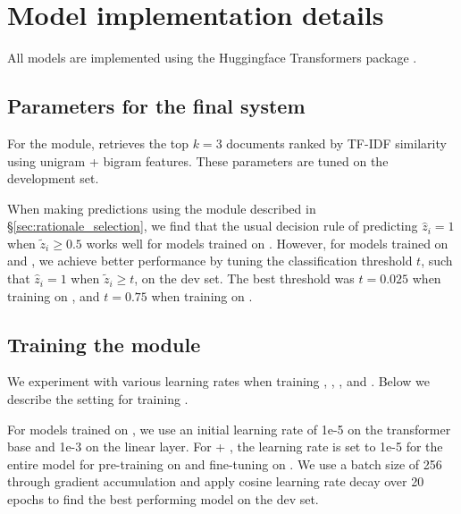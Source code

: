 \clearpage

\appendix

\section{Model implementation details} \label{sec:model_details}

All models are implemented using the Huggingface Transformers package \cite{Wolf2019HuggingFacesTS}.


\subsection{Parameters for the final \sysname system} \label{sec:parameters}

For the \componentone module, \sysname retrieves the top $k=3$ documents ranked by TF-IDF similarity using unigram + bigram features. These parameters are tuned on the \ours development set.

When making predictions using the \componenttwo module described in \S\ref{sec:rationale_selection}, we find that the usual decision rule of predicting $\hat{z}_i = 1$ when $\tilde{z}_i \geq 0.5$ works well for models trained on \ours. However, for models trained on \fever and \snopes, we achieve better performance by tuning the classification threshold $t$, such that $\hat{z}_i = 1$  when $\tilde{z}_i \geq t$, on the \ours dev set. The best threshold was $t=0.025$ when training on \fever, and $t=0.75$ when training on \snopes.




\subsection{Training the \componenttwo module}

We experiment with various learning rates when training \scibert, \bioroberta, \robertabase, and \robertalarge. Below we describe the setting for training \robertalarge.

For models trained on \ours, we use an initial learning rate of 1e-5 on the transformer base and 1e-3 on the linear layer. For \fever + \ours, the learning rate is set to 1e-5 for the entire model for pre-training on \fever and fine-tuning on \ours. We use a batch size of 256 through gradient accumulation and apply cosine learning rate decay over 20 epochs to find the best performing model on the dev set.

